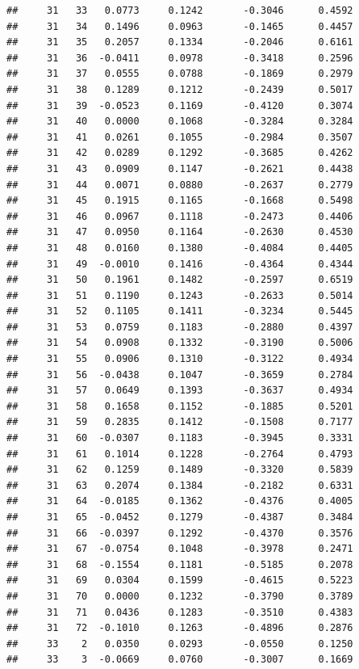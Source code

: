 \documentclass[
]{article}
\begin{document}
\begin{verbatim}
##     31   33   0.0773     0.1242       -0.3046      0.4592  
##     31   34   0.1496     0.0963       -0.1465      0.4457  
##     31   35   0.2057     0.1334       -0.2046      0.6161  
##     31   36  -0.0411     0.0978       -0.3418      0.2596  
##     31   37   0.0555     0.0788       -0.1869      0.2979  
##     31   38   0.1289     0.1212       -0.2439      0.5017  
##     31   39  -0.0523     0.1169       -0.4120      0.3074  
##     31   40   0.0000     0.1068       -0.3284      0.3284  
##     31   41   0.0261     0.1055       -0.2984      0.3507  
##     31   42   0.0289     0.1292       -0.3685      0.4262  
##     31   43   0.0909     0.1147       -0.2621      0.4438  
##     31   44   0.0071     0.0880       -0.2637      0.2779  
##     31   45   0.1915     0.1165       -0.1668      0.5498  
##     31   46   0.0967     0.1118       -0.2473      0.4406  
##     31   47   0.0950     0.1164       -0.2630      0.4530  
##     31   48   0.0160     0.1380       -0.4084      0.4405  
##     31   49  -0.0010     0.1416       -0.4364      0.4344  
##     31   50   0.1961     0.1482       -0.2597      0.6519  
##     31   51   0.1190     0.1243       -0.2633      0.5014  
##     31   52   0.1105     0.1411       -0.3234      0.5445  
##     31   53   0.0759     0.1183       -0.2880      0.4397  
##     31   54   0.0908     0.1332       -0.3190      0.5006  
##     31   55   0.0906     0.1310       -0.3122      0.4934  
##     31   56  -0.0438     0.1047       -0.3659      0.2784  
##     31   57   0.0649     0.1393       -0.3637      0.4934  
##     31   58   0.1658     0.1152       -0.1885      0.5201  
##     31   59   0.2835     0.1412       -0.1508      0.7177  
##     31   60  -0.0307     0.1183       -0.3945      0.3331  
##     31   61   0.1014     0.1228       -0.2764      0.4793  
##     31   62   0.1259     0.1489       -0.3320      0.5839  
##     31   63   0.2074     0.1384       -0.2182      0.6331  
##     31   64  -0.0185     0.1362       -0.4376      0.4005  
##     31   65  -0.0452     0.1279       -0.4387      0.3484  
##     31   66  -0.0397     0.1292       -0.4370      0.3576  
##     31   67  -0.0754     0.1048       -0.3978      0.2471  
##     31   68  -0.1554     0.1181       -0.5185      0.2078  
##     31   69   0.0304     0.1599       -0.4615      0.5223  
##     31   70   0.0000     0.1232       -0.3790      0.3789  
##     31   71   0.0436     0.1283       -0.3510      0.4383  
##     31   72  -0.1010     0.1263       -0.4896      0.2876  
##     33    2   0.0350     0.0293       -0.0550      0.1250  
##     33    3  -0.0669     0.0760       -0.3007      0.1669  

\end{verbatim}
\end{document}
